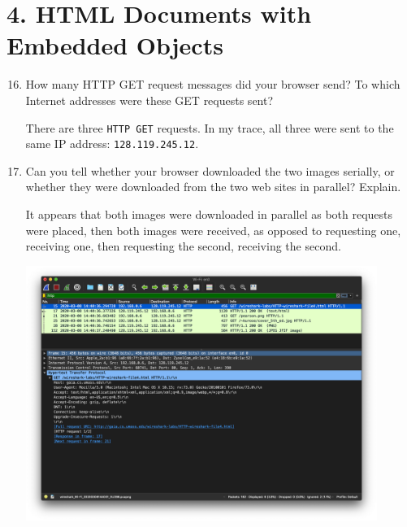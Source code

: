 \documentclass{article}
\begin{document}
\begin{enumerate}
\end{enumerate}

\section*{4. HTML Documents with Embedded Objects}
\begin{enumerate}
\setcounter{enumi}{15}
\item How many HTTP GET request messages did your browser send? To which Internet addresses were these GET requests sent?

\textsf{There are three \texttt{HTTP GET} requests. In my trace, all three were sent to the same IP address: \texttt{128.119.245.12}.}

\item Can you tell whether your browser downloaded the two images serially, or whether they were downloaded from the two web sites in parallel? Explain.

\textsf{It appears that both images were downloaded in parallel as both requests were placed, then both images were received, as opposed to requesting one, receiving one, then requesting the second, receiving the second.}

\includegraphics[width=0.90\textwidth]{lab2_part4_get1}

\end{enumerate}
\end{document}
